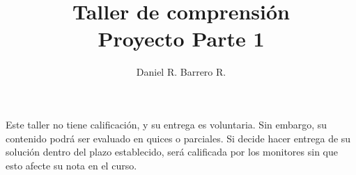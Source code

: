\documentclass{amsart}
\title{Taller de comprensión\\ Proyecto Parte 1}
\author{Daniel R. Barrero R.}
\begin{document}
\maketitle

\section*{} Este taller no tiene calificación, y su entrega es voluntaria. Sin
embargo, su contenido podrá ser evaluado en quices o parciales. Si decide hacer
entrega de su solución dentro del plazo establecido, será calificada por los
monitores sin que esto afecte su nota en el curso.
\end{document}
